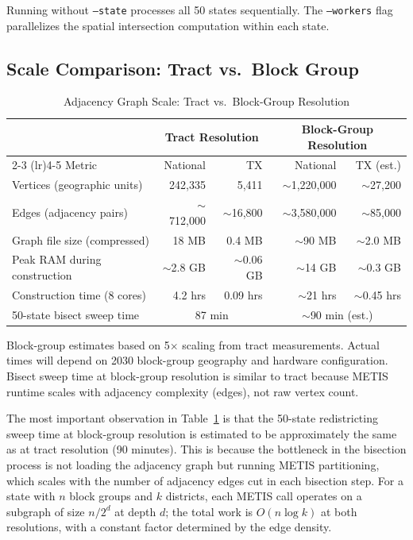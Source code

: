 Running without \texttt{--state} processes all 50 states sequentially. The \texttt{--workers}
flag parallelizes the spatial intersection computation within each state.

\subsection{Scale Comparison: Tract vs.\ Block Group}

\begin{table}[ht]
\centering
\caption{Adjacency Graph Scale: Tract vs.\ Block-Group Resolution}
\label{tab:scale}
\begin{tabular}{lrrrr}
\toprule
 & \multicolumn{2}{c}{Tract Resolution} & \multicolumn{2}{c}{Block-Group Resolution} \\
\cmidrule(lr){2-3} \cmidrule(lr){4-5}
Metric & National & TX & National & TX (est.) \\
\midrule
Vertices (geographic units) & 242,335 & 5,411 & $\sim$1,220,000 & $\sim$27,200 \\
Edges (adjacency pairs) & $\sim$712,000 & $\sim$16,800 & $\sim$3,580,000 & $\sim$85,000 \\
Graph file size (compressed) & 18 MB & 0.4 MB & $\sim$90 MB & $\sim$2.0 MB \\
Peak RAM during construction & $\sim$2.8 GB & $\sim$0.06 GB & $\sim$14 GB & $\sim$0.3 GB \\
Construction time (8 cores) & 4.2 hrs & 0.09 hrs & $\sim$21 hrs & $\sim$0.45 hrs \\
\midrule
50-state bisect sweep time & \multicolumn{2}{c}{87 min} & \multicolumn{2}{c}{$\sim$90 min (est.)} \\
\bottomrule
\end{tabular}
\begin{tablenotes}
\small
\item Block-group estimates based on 5$\times$ scaling from tract measurements.
  Actual times will depend on 2030 block-group geography and hardware configuration.
  Bisect sweep time at block-group resolution is similar to tract because METIS runtime
  scales with adjacency complexity (edges), not raw vertex count.
\end{tablenotes}
\end{table}

The most important observation in Table~\ref{tab:scale} is that the 50-state redistricting
sweep time at block-group resolution is estimated to be approximately the same as at
tract resolution (90 minutes). This is because the bottleneck in the bisection process
is not loading the adjacency graph but running METIS partitioning, which scales with
the number of adjacency edges cut in each bisection step. For a state with $n$ block
groups and $k$ districts, each METIS call operates on a subgraph of size $n/2^d$ at
depth $d$; the total work is $O(n \log k)$ at both resolutions, with a constant factor
determined by the edge density.

